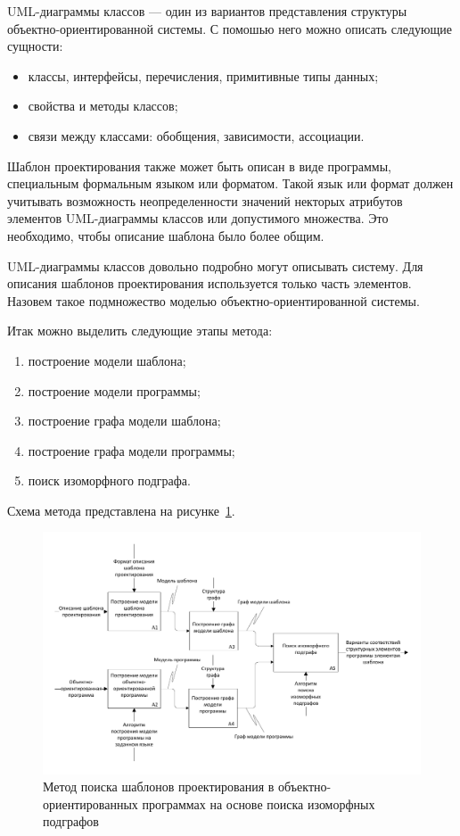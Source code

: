 UML-диаграммы классов --- один из вариантов представления структуры
объектно-ориентированной системы.
С помошью него можно описать следующие сущности:
\begin{itemize}
\item классы, интерфейсы, перечисления, примитивные типы данных;
\item свойства и методы классов;
\item связи между классами: обобщения, зависимости, ассоциации.
\end{itemize}

Шаблон проектирования также может быть описан в виде программы, специальным
формальным языком или форматом.
Такой язык или формат должен учитывать возможность неопределенности значений
некторых атрибутов элементов UML-диаграммы классов или допустимого множества.
Это необходимо, чтобы описание шаблона было более общим.

UML-диаграммы классов довольно подробно могут описывать систему.
Для описания шаблонов проектирования используется только часть элементов.
Назовем такое подмножество моделью объектно-ориентированной системы.

Итак можно выделить следующие этапы метода:
\begin{enumerate}
\item построение модели шаблона;
\item построение модели программы;
\item построение графа модели шаблона;
\item построение графа модели программы;
\item поиск изоморфного подграфа.
\end{enumerate}

Схема метода представлена на рисунке~\ref{fig:idef0-specific}.

\begin{figure}
\centering
\includegraphics[angle=90]{inc/idef0-specific.pdf}
\caption{Метод поиска шаблонов проектирования в объектно-ориентированных программах на основе поиска изоморфных подграфов}
\label{fig:idef0-specific}
\end{figure}
